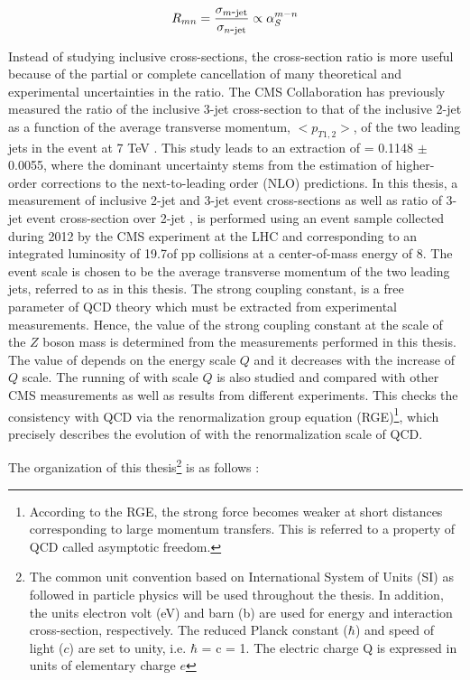 \begin{equation}
R_{mn} = \frac{\sigma_{m\hy {\rm jet}}}{\sigma_{n\hy {\rm jet}}} \propto \alps^{m-n}
\label{eq:ratio_mn}
\end{equation}

Instead of studying inclusive cross-sections, the cross-section ratio is more useful because of the partial or complete cancellation of many theoretical and experimental uncertainties in the ratio. The CMS Collaboration has previously measured the ratio of the inclusive 3-jet cross-section to that of the inclusive 2-jet as a function of the average transverse momentum, $<p_{T1,2}>$, of the two leading jets in the event at 7 TeV \cite {Chatrchyan:2013txa}. This study leads to an extraction of \alpsmz = 0.1148 $\pm$ 0.0055, where the dominant uncertainty stems from the estimation of higher-order corrections to the next-to-leading order (NLO) predictions. In this thesis, a measurement of inclusive 2-jet and 3-jet event cross-sections as well as ratio of 3-jet event cross-section over 2-jet \rations, is performed using an event sample collected during 2012 by the CMS experiment at the LHC and corresponding to an integrated luminosity of 19.7\fbinv of pp collisions at a center-of-mass energy of 8\TeV. The event scale is chosen to be the average transverse momentum of the two leading jets, referred to as \httwo in this thesis. The strong coupling constant, \alps is a free parameter of QCD theory which must be extracted from experimental measurements. Hence, the value of the strong coupling constant at the scale of the $Z$ boson mass \alpsmz is determined from the measurements performed in this thesis. The value of \alps depends on the energy scale $Q$ and it decreases with the increase of $Q$ scale. The running of \alps with scale $Q$ is also studied and compared with other CMS measurements as well as results from different experiments. This checks the consistency with QCD via the renormalization group equation (RGE)\footnote{According to the RGE, the strong force becomes weaker at short distances corresponding to large momentum transfers. This is referred to a property of QCD called asymptotic freedom.}, which precisely describes the evolution of \alps with the renormalization scale of QCD. 

The organization of this thesis\footnote{The common unit convention based on International System of Units (SI) as followed in particle physics will be used throughout the thesis. In addition, the units electron volt (eV) and barn (b) are used for energy and interaction cross-section, respectively. The reduced Planck constant ($\hbar$) and speed of light ($c$) are set to unity, i.e. $\hbar$ = c = 1. The electric charge Q is expressed in units of elementary charge $e$} is as follows :

